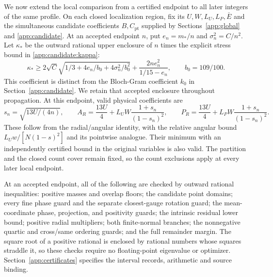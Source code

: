 We now extend the local comparison from a certified endpoint to all
later integers of the same profile. On each closed localization region,
fix its $U,W,L_U,L_P,\bar E$ and the simultaneous candidate
coefficients $B,C_{\mathrm{pt}}$ supplied by Sections~\ref{app:global} and
\ref{app:candidate}. At an accepted endpoint $n$, put $e_n=m_*/n$ and
$\sigma_n^2=C/n^2$. Let $\kappa_*$ be the outward rational upper enclosure
of $n$ times the explicit stress bound in \eqref{app:candidate:kappa}:
\[
 \kappa_*\ge
 2\sqrt C\sqrt{1/3+4e_n/b_0+4\sigma_n^2/b_0^2}
       +\frac{2ne_n^2}{1/15-e_n},\qquad b_0=109/100.
\]
This coefficient is distinct from the Bloch-Gram coefficient $k_0$ in
Section~\ref{app:candidate}. We retain that accepted enclosure throughout
propagation. At this endpoint, valid physical coefficients are
\begin{equation}\label{app:local:frozen-physical}
 s_n=\sqrt{13U/(4n)},\qquad
 A_R=\frac{13U}4+L_UW\frac{1+s_n}{(1-s_n)^2},\qquad
 P_R=\frac{13U}4+L_PW\frac{1+s_n}{(1-s_n)^2}.
\end{equation}
These follow from the radial/angular identity, with the relative
angular bound $L_Uw/[N(1-s)^2]$ and its pointwise analogue. Their minimum
with an independently certified bound in the original variables is
also valid. The partition and the closed count cover remain fixed, so
the count exclusions apply at every later local endpoint.

At an accepted endpoint, all of the following are checked by outward
rational inequalities: positive masses and overlap floors; the
candidate point domains; every fine phase guard and the separate
closest-gauge rotation guard; the mean-coordinate phase, projection,
and positivity guards; the intrinsic residual lower bound; positive
radial multipliers; both finite-normal branches; the nonnegative
quartic and cross/same ordering guards; and the full remainder margin.
The square root of a positive rational is enclosed by rational numbers
whose squares straddle it, so these checks require no floating-point
eigenvalue or optimizer. Section~\ref{app:certificates} specifies
the interval records, arithmetic and source binding.

